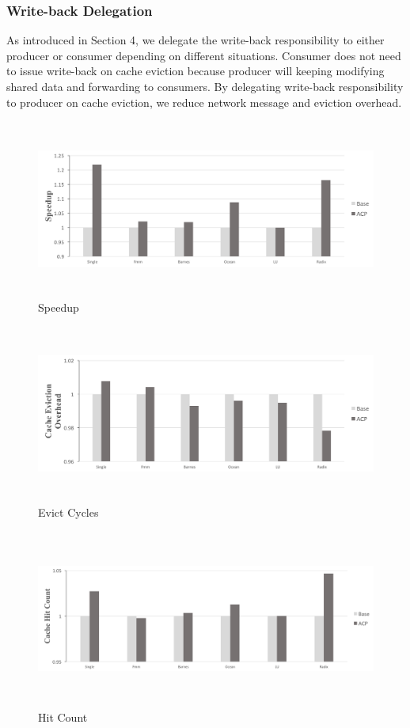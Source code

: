 \documentclass[11pt,conference]{IEEEtran}
\begin{document}
\subsubsection{Write-back Delegation}
As introduced in Section 4, we delegate the write-back responsibility to either producer or consumer depending on different situations. Consumer does not need to issue write-back on cache eviction because producer will keeping modifying shared data and forwarding to consumers. By delegating write-back responsibility to producer on cache eviction, we reduce network message and eviction overhead.

\newpage

\begin{figure}[!h]
\centering
\hfil
\captionsetup{justification=centering}
\includegraphics[width=7.5in,height=2.3in]{speedup.png}
\caption{Speedup}
\label{speedup}
\end{figure}
\FloatBarrier

\begin{figure}[!h]
\centering
\captionsetup{justification=centering}
\includegraphics[width=7.5in,height=2.3in]{evict_cycles.png}
\caption{Evict Cycles}
\label{evict_cycles}
\end{figure}
\FloatBarrier

\begin{figure}[!h]
\centering
\captionsetup{justification=centering}
\includegraphics[width=7.5in,height=2.3in]{hit_count.png}
\caption{Hit Count}
\label{hit_count}
\end{figure}
\FloatBarrier
\end{document}
